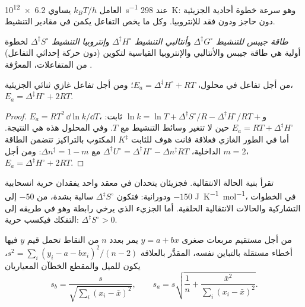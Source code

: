 العامل $k_BT/h$ يساوي \qty{6.2e12}{s^{-1}} عند \qty{298}{K}: وهو سرعة خطوة أحادية الجزيئية
دون حاجز ودون فقد للإنتروبيا. وكل ما يخص التفاعل يكمن
في مقادير التنشيط.

\begin{definition}\label{def:b3:rate-theories:activation}
\emph{طاقة جيبس للتنشيط}
$\Delta^{\ddagger}G^\circ$ و\emph{أنتالبي التنشيط} $\Delta^{\ddagger}H^\circ$ 
و\emph{إنتروبيا التنشيط} $\Delta^{\ddagger}S^\circ$ لخطوة أولية
هي طاقة جيبس والأنتالبي والإنتروبيا القياسية لتكوين
 (دون حركة إحداثي التفاعل) من المتفاعلات،
المعرَّفة .
\end{definition}

\begin{proposition}\label{prop:b3:rate-theories:ea-dh}
من أجل تفاعل في محلول، $E_a = \Delta^{\ddagger}H^\circ + RT$؛ ومن أجل تفاعل غازي ثنائي الجزيئية،
$E_a = \Delta^{\ddagger}H^\circ + 2RT$.
\end{proposition}

\begin{proof}
$E_a = RT^2\,\dd\ln k/\dd T$، و$\ln k = \ln T + \Delta^{\ddagger}S^\circ/R - \Delta^{\ddagger}H^\circ/RT + $ ثابت: $E_a =
RT + \Delta^{\ddagger}H^\circ$ حين لا تتغير وسائط التنشيط مع $T$. وفي المحلول
هذه هي النتيجة. أما في الطور الغازي فعلاقة فانت هوف للثابت $K^{\ddagger}$ المكتوب
بالتراكيز تتضمن الطاقة الداخلية، $\Delta^{\ddagger}U^\circ = \Delta^{\ddagger}H^\circ - \Delta n^{\ddagger}RT$
مع $\Delta n^{\ddagger} = 1 - m$: ومن أجل $m = 2$، $E_a = \Delta^{\ddagger}H^\circ + 2RT$.
\end{proof}

تقرأ  بنية الحالة الانتقالية. فجزيئان
يتحدان في معقد واحد يفقدان حرية انسحابية ودورانية:
فتكون $\Delta^{\ddagger}S^\circ$ سالبة بشدة، من $-50$ إلى $-150$ \unit{J.K^{-1}.mol^{-1}}، في
الخطوات التشاركية والحالات الانتقالية الحلقية. أما الجزيء الذي يرخي رابطة
وهو في طريقه إلى التفكك فيكسب حرية: $\Delta^{\ddagger}S^\circ > 0$.

\begin{proposition}\label{prop:b3:rate-theories:slope-uncertainty}
من أجل مستقيم مربعات صغرى $y = a + bx$ يمر بعدد $n$ من النقاط تحمل قيم $y$ فيها
أخطاء مستقلة بالتباين نفسه، المقدَّر بالعلاقة $s^2 = \sum_i(y_i - a - bx_i)^2/(n - 2)$،
يكون للميل والمقطع الخطآن المعياريان
\[
  s_b = \frac{s}{\sqrt{\sum_i(x_i - \bar x)^2}}, \qquad
  s_a = s\sqrt{\frac1n + \frac{\bar x^2}{\sum_i(x_i - \bar x)^2}} .
\]
\end{proposition}

